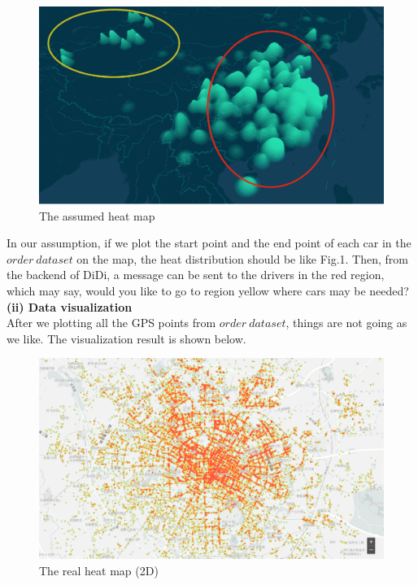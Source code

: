 \documentclass[10pt,journal]{IEEEtran}
\begin{document}
\begin{figure}[!ht]
    \centering
    \includegraphics[width=0.9\columnwidth]{Fig/assumption.png}
    \caption{The assumed heat map}
 \end{figure}

In our assumption, if we plot the start point and the end point of each car in the $order\ dataset$ on the map, the heat distribution should be like Fig.1. Then, from the backend of DiDi, a message can be sent to the drivers in the red region, which may say, would you like to go to region yellow where cars may be needed? \\ 

\textbf{(ii) Data visualization}\\

After we plotting all the GPS points from $order\ dataset$, things are not going as we like. The visualization result is shown below.

\begin{figure}[!ht]
    \centering
    \includegraphics[width=1.0\columnwidth]{Fig/2D.png}
    \caption{The real heat map (2D)}
 \end{figure}
\end{document}
